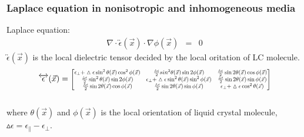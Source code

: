 \documentclass{beamer}
\newcommand\scalemath[2]{\scalebox{#1}{\mbox{\ensuremath{\displaystyle #2}}}} %
\begin{document}
\begin{frame}
\frametitle{Laplace equation in nonisotropic and inhomogeneous media}
Laplace equation:
\begin{eqnarray}
\nabla \cdot \overleftrightarrow{\epsilon}(\vec x) \cdot \nabla \phi(\vec x) &=& 0 \nonumber
\label{eq:laplace}
\end{eqnarray}
$\overleftrightarrow{\epsilon}(\vec x)$ is the local dielectric tensor decided by the local oritation of LC molecule. 
\\
\begin{eqnarray}
\overleftrightarrow{\epsilon}(\vec x) = 
\scalemath{0.7}{
\begin{bmatrix}
\epsilon_{\perp}+\vartriangle\epsilon \sin^2\theta(\vec{x})\cos^2\phi(\vec{x}) & \frac{\vartriangle\epsilon}{2} sin^2\theta(\vec{x})\sin 2\phi(\vec{x}) & \frac{\vartriangle\epsilon}{2} \sin 2\theta(\vec{x})\cos\phi(\vec{x}) \\
\frac{\vartriangle\epsilon}{2} \sin^2\theta(\vec{x})\sin 2\phi(\vec{x}) & \epsilon_{\perp}+\vartriangle\epsilon \sin^2\theta(\vec{x})\sin^2\phi(\vec{x}) & \frac{\vartriangle\epsilon}{2} \sin 2\theta(\vec{x})\sin\phi(\vec{x}) \\
\frac{\vartriangle\epsilon}{2} \sin 2\theta(\vec{x})\cos\phi(\vec{x}) & \frac{\vartriangle\epsilon}{2} \sin 2\theta(\vec{x})\sin\phi(\vec{x}) & \epsilon_{\perp}+\vartriangle\epsilon \cos^2\theta(\vec{x})\\ 
\end{bmatrix}}
\nonumber
\label{eq:dielectric_tensor}
\end{eqnarray}
\\
where $\theta(\vec{x})$ and $\phi(\vec{x})$ is the local orientation of liquid crystal molecule, $\vartriangle\epsilon = \epsilon_{\parallel}-\epsilon_{\perp}$.
\end{frame}
\end{document}
